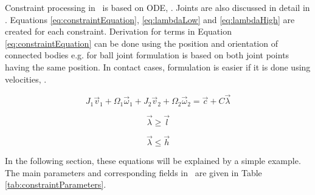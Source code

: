 \begin{table}
\label{tab:eom-g}
\end {table}

Constraint processing in \cbullet\ is based on ODE, \cite{ode}.
Joints are also discussed in detail in  
\cite{erleben.thesis}.
Equations \ref{eq:constraintEquation}, \ref{eq:lambdaLow} and
\ref{eq:lambdaHigh} 
are created for each constraint. 
Derivation for terms in Equation \ref{eq:constraintEquation}
can be done using the position and orientation of connected bodies
e.g. for ball joint formulation is based on both joint points having the same position.
In contact cases, formulation is easier if it is done using velocities, \cite{ode.joints}.

\begin{equation} \label{eq:constraintEquation}
J_1 \vec{v}_1 + \Omega_1 \vec{\omega}_1 + 
J_2 \vec{v}_2 + \Omega_2 \vec{\omega}_2 = \vec{c} + C \vec{\lambda}
\end{equation}

\begin{equation} \label{eq:lambdaLow}
\vec{\lambda} \geq \vec{l}
\end{equation}

\begin{equation} \label{eq:lambdaHigh}
\vec{\lambda} \leq \vec{h}
\end{equation}

In the following section, these equations will be explained by a simple example.
The main parameters  and corresponding fields in \cbullet\  
are given in Table \ref{tab:constraintParameters}.

